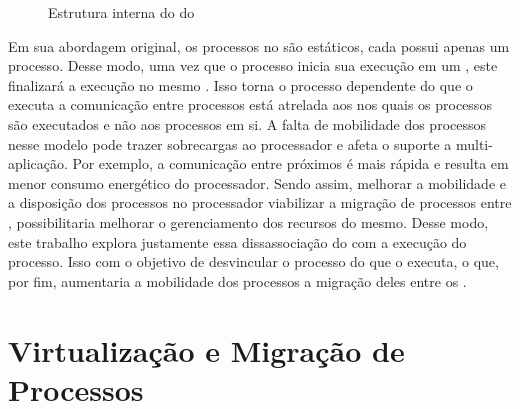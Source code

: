 \begin{figure}[bt]
    \centering
    
    \caption{Estrutura interna do \microkernel do \nanvix \cite{penna:thesis}}\label{fig.microkernel-overview}
\end{figure}

Em sua abordagem original, os processos no \nanvix são estáticos, \ie cada \cluster possui apenas um processo. Desse modo, uma vez que o processo inicia sua execução em um \cluster, este finalizará a execução no mesmo \cluster. 
Isso torna o processo dependente do \cluster que o executa \eg a comunicação entre processos está atrelada aos \clusters nos quais os processos são executados e não aos processos em si. A falta de mobilidade dos processos nesse modelo pode trazer sobrecargas ao processador e afeta o suporte a multi-aplicação. Por exemplo, a comunicação entre \clusters próximos é mais rápida e resulta em menor consumo energético do processador. Sendo assim, melhorar a mobilidade e a disposição dos processos no processador \ie viabilizar a migração de processos entre \clusters, possibilitaria melhorar o gerenciamento dos recursos do mesmo. Desse modo, este trabalho explora justamente essa dissassociação do \hardware com a execução do processo. Isso com o objetivo de desvincular o processo do \cluster que o executa, o que, por fim, aumentaria a mobilidade dos processos \ie a migração deles entre os \clusters.

\section{Virtualização e Migração de Processos}
\label{sec.virtualizacao}
